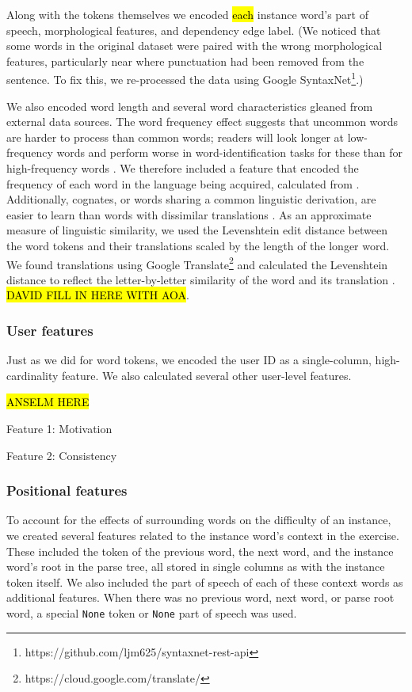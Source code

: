 \documentclass[11pt,a4paper]{article}
\begin{document}
Along with the tokens themselves we encoded \hl{each} instance word's part of speech,
morphological features, and dependency edge label. (We noticed that some words
in the original dataset were paired with the wrong morphological features,
particularly near where punctuation had been removed from the sentence. To fix
this, we re-processed the data using Google SyntaxNet\footnote{https://github.com/ljm625/syntaxnet-rest-api}.)

We also encoded word length and several word characteristics gleaned from
external data sources. The word frequency effect suggests that uncommon words are harder to process than common words; readers will look longer at low-frequency words and perform worse in word-identification tasks for these than for high-frequency words \cite{rayner1998eye}. We therefore included a feature that encoded the frequency of each word in the language being acquired, calculated from \citet{robert_speer_2017_998161}. Additionally, cognates, or words sharing a common linguistic derivation, are easier to learn than words with dissimilar translations \cite{de2000hard}. As an approximate measure of linguistic similarity, we used the Levenshtein edit distance between the word tokens and their translations scaled by the length of the longer word. We found translations using Google Translate\footnote{https://cloud.google.com/translate/} and calculated the Levenshtein distance to reflect the letter-by-letter similarity of the word and its translation \cite{hyyro2001explaining}. \hl{DAVID FILL IN HERE WITH AOA}. 

\subsubsection{User features}

Just as we did for word tokens, we encoded the user ID as a single-column,
high-cardinality feature. We also calculated several other user-level features.

\hl{ANSELM HERE}

Feature 1: Motivation %

Feature 2: Consistency %



\subsubsection{Positional features}

To account for the effects of surrounding words on the difficulty of an
instance, we created several features related to the instance word's context in
the exercise. These included the token of the previous word, the next word, and
the instance word's root in the parse tree, all stored in single columns as with
the instance token itself. We also included the part of speech of each of these
context words as additional features. When there was no previous word, next word, or parse
root word, a special {\tt None} token or {\tt None} part of speech was used.
\end{document}
